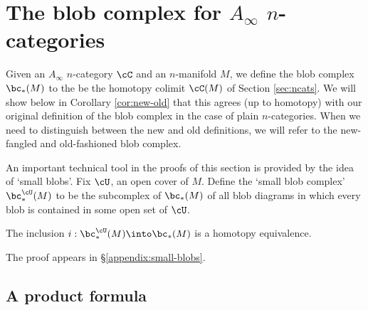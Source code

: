 
\section{The blob complex for $A_\infty$ $n$-categories}
\label{sec:ainfblob}

Given an $A_\infty$ $n$-category $\cC$ and an $n$-manifold $M$, we define the blob
complex $\bc_*(M)$ to the be the homotopy colimit $\cC(M)$ of Section \ref{sec:ncats}.
We will show below 
in Corollary \ref{cor:new-old}
that this agrees (up to homotopy) with our original definition of the blob complex
in the case of plain $n$-categories.
When we need to distinguish between the new and old definitions, we will refer to the 
new-fangled and old-fashioned blob complex.

\medskip

An important technical tool in the proofs of this section is provided by the idea of `small blobs'.
Fix $\cU$, an open cover of $M$. Define the `small blob complex' $\bc^{\cU}_*(M)$ to be the subcomplex of $\bc_*(M)$ of all blob diagrams in which every blob is contained in some open set of $\cU$. 

\begin{thm} \label{thm:small-blobs}
The inclusion $i: \bc^{\cU}_*(M) \into \bc_*(M)$ is a homotopy equivalence.
\end{thm}
The proof appears in \S \ref{appendix:small-blobs}.

\subsection{A product formula}
\label{ss:product-formula}



